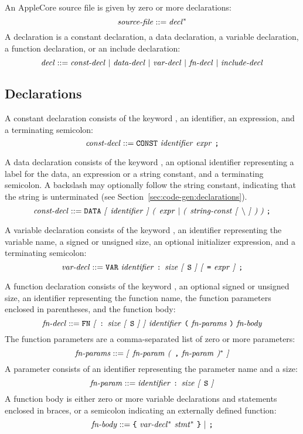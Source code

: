 \documentclass[10pt]{article}
\begin{document}
An AppleCore source file is given by zero or more
declarations:
%
$$\mbox{\textit{source-file}} ::= \mbox{\textit{decl}}^*$$
%
A declaration is a constant declaration, a data declaration, a
variable declaration, a function declaration, or an include
declaration:
%
$$\mbox{\textit{decl}} ::= \mbox{\ensuremath{\mbox{\textit{const-decl}}} $|$
  \ensuremath{\mbox{\textit{data-decl}}} $|$ \ensuremath{\mbox{\textit{var-decl}}} $|$ \ensuremath{\mbox{\textit{fn-decl}}}
    $|$ \ensuremath{\mbox{\textit{include-decl}}}}$$

\subsection{Declarations}
\label{sec:syntax:declarations}

 A constant declaration consists of the
keyword , an identifier, an expression, and a terminating
semicolon:
%
$$\mbox{\textit{const-decl}} ::= \mbox{\texttt{CONST} \ensuremath{\mbox{\textit{identifier}}}
  \ensuremath{\mbox{\textit{expr}}} \texttt{;}}$$

 A data declaration consists of the keyword
, an optional identifier representing a label for the data,
an expression or a string constant, and a terminating semicolon.  A
backslash may optionally follow the string constant, indicating that
the string is unterminated (see
Section~\ref{sec:code-gen:declarations}).
%
$$\nonterm{const-decl} ::= \mbox{\kwd{DATA} \opt{\nonterm{identifier}}
  \group{\nonterm{expr} $|$ \group{\nonterm{string-const} \opt{\bs}}}
  \kwd{;}}$$

 A variable declaration consists of the
keyword , an identifier representing the variable name, a
signed or unsigned size, an optional initializer expression, and a
terminating semicolon:
%
$$\mbox{\textit{var-decl}} ::= \mbox{\texttt{VAR} \ensuremath{\mbox{\textit{identifier}}} \texttt{:}
  \ensuremath{\mbox{\textit{size}}} \textit{[} \texttt{S} \textit{]} \textit{[} \texttt{=} \ensuremath{\mbox{\textit{expr}}} \textit{]} \texttt{;}}$$

 A function declaration consists of the
keyword , an optional signed or unsigned size, an identifier
representing the function name, the function parameters enclosed in
parentheses, and the function body:
%
$$\mbox{\textit{fn-decl}} ::= \mbox{\texttt{FN} \textit{[} \texttt{:} \ensuremath{\mbox{\textit{size}}}
    \textit{[} \texttt{S} \textit{]} \textit{]} \ensuremath{\mbox{\textit{identifier}}} \texttt{(} \ensuremath{\mbox{\textit{fn-params}}}
  \texttt{)} \ensuremath{\mbox{\textit{fn-body}}}}$$
%
The function parameters are a comma-separated list of zero or more
parameters:
%
$$\mbox{\textit{fn-params}} ::= \mbox{\textit{[} \ensuremath{\mbox{\textit{fn-param}}} \textit{(} \texttt{,}
    \ensuremath{\mbox{\textit{fn-param}}} \textit{)}$^*$ \textit{]}}$$
%
A parameter consists of an identifier representing the parameter name
and a size:
%
$$\mbox{\textit{fn-param}} ::= \mbox{\ensuremath{\mbox{\textit{identifier}}} \texttt{:}
  \ensuremath{\mbox{\textit{size}}} \textit{[} \texttt{S} \textit{]}}$$
%
A function body is either zero or more variable declarations and
statements enclosed in braces, or a semicolon indicating an externally
defined function:
%
$$\mbox{\textit{fn-body}} ::= \mbox{\texttt{\{} \ensuremath{\mbox{\textit{var-decl}}}$^*$
  \ensuremath{\mbox{\textit{stmt}}}$^*$ \texttt{\}} $|$ \texttt{;}}$$
\end{document}
